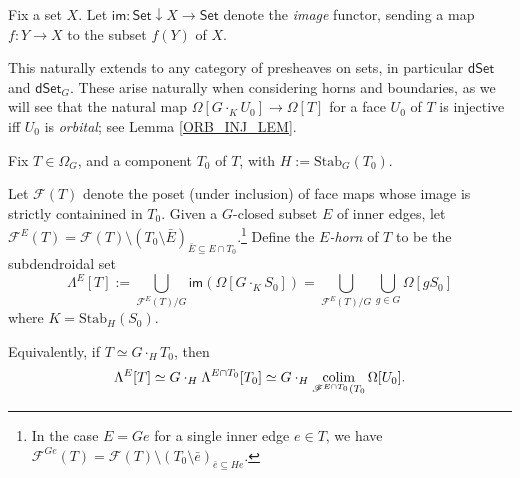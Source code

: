 \documentclass[a4paper,10p,draft]{article}%
\numberwithin{equation}{section}%
\begin{document}
\begin{definition}
      Fix a set $X$.
      Let $\mathsf{im}: \mathsf{Set} \downarrow X \to \mathsf{Set}$
      denote the \textit{image} functor,
      sending a map $f:Y \to X$ to the subset $f(Y)$ of $X$.
\end{definition}

\begin{remark}
      This naturally extends to any category of presheaves on sets,
      in particular $\mathsf{dSet}$ and $\mathsf{dSet}_G$.
      These arise naturally when considering horns and boundaries, as we will see that the natural map
      $\Omega[G \cdot_K U_0] \to \Omega[T]$
      for a face $U_0$ of $T$ is injective iff $U_0$ is \textit{orbital}; see Lemma \ref{ORB_INJ_LEM}.      
\end{remark}


\begin{definition}
      Fix $T\in \Omega_G$, and a component $T_0$ of $T$, with $H := \mathrm{Stab}_G(T_0)$.
      
      Let $\mathscr{F}(T)$ denote the poset (under inclusion) of face maps whose image is
      strictly containined in $T_0$.
      Given a $G$-closed subset $E$ of inner edges, let
      $\mathscr{F}^{E}(T) = \mathscr{F}(T) \setminus (T_0 \setminus \bar E)_{\bar E \subseteq E \cap T_0}$.\footnote{
        In the case $E = G e$ for a single inner edge $e \in T$, we have
      $\mathscr{F}^{G e}(T) = \mathscr{F}(T) \setminus (T_0 \setminus \bar e)_{\bar e \subseteq H e}$.}
      Define the \textit{$E$-horn} of $T$ to be the subdendroidal set
      \begin{equation}
            \Lambda^{E}[T] := \mathop{\bigcup}\limits_{\mathscr{F}^E(T)/G}\mathsf{im}\left(\Omega[G \cdot_K S_0]\right)
            = \mathop{\bigcup}\limits_{\mathscr{F}^E(T)/G}\mathop{\bigcup}\limits_{g \in G}\Omega[g S_0]
      \end{equation}
      where $K = \mathrm{Stab}_H(S_0)$.
  \end{definition}

\begin{remark}
      Equivalently, if $T \simeq G \cdot_H T_0$, then
      \begin{equation}
            \Lambda^{E}[T] \simeq G \cdot_H \Lambda^{E \cap T_0}[T_0]
            \simeq G \cdot_H \mathop{\operatorname{colim}}\limits_{\mathscr{F}^{E \cap T_0}(T_0}\Omega[U_0].
      \end{equation}
\end{remark}
\end{document}
